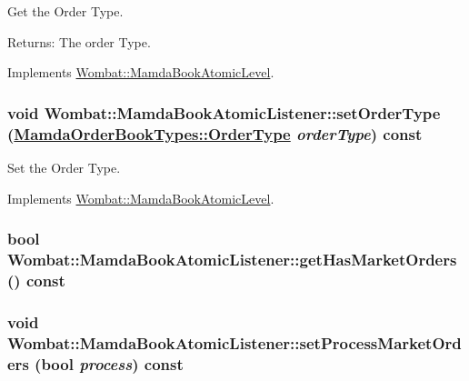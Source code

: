 Get the Order Type. 

\begin{Desc}
\item[Returns:]The order Type. \end{Desc}


Implements \hyperlink{classWombat_1_1MamdaBookAtomicLevel_23ff595e16fe3926bb2714c5c2026841}{Wombat::Mamda\-Book\-Atomic\-Level}.\hypertarget{classWombat_1_1MamdaBookAtomicListener_e79c2bbb2c0431a40df5788700a26c32}{
\subsubsection[setOrderType]{\setlength{\rightskip}{0pt plus 5cm}void Wombat::Mamda\-Book\-Atomic\-Listener::set\-Order\-Type (\hyperlink{classWombat_1_1MamdaOrderBookTypes_b1b75d93c83c5a1042c392ab46a27291}{Mamda\-Order\-Book\-Types::Order\-Type} {\em order\-Type}) const}}
\label{classWombat_1_1MamdaBookAtomicListener_e79c2bbb2c0431a40df5788700a26c32}


Set the Order Type. 



Implements \hyperlink{classWombat_1_1MamdaBookAtomicLevel_6b9fa11952fb136aceda2810f3131aeb}{Wombat::Mamda\-Book\-Atomic\-Level}.\hypertarget{classWombat_1_1MamdaBookAtomicListener_67cf7b76360ca22ced5384aa52bf9873}{
\subsubsection[getHasMarketOrders]{\setlength{\rightskip}{0pt plus 5cm}bool Wombat::Mamda\-Book\-Atomic\-Listener::get\-Has\-Market\-Orders () const}}
\label{classWombat_1_1MamdaBookAtomicListener_67cf7b76360ca22ced5384aa52bf9873}


\hypertarget{classWombat_1_1MamdaBookAtomicListener_70a97f14892aaa3a9887b12ccc816651}{
\subsubsection[setProcessMarketOrders]{\setlength{\rightskip}{0pt plus 5cm}void Wombat::Mamda\-Book\-Atomic\-Listener::set\-Process\-Market\-Orders (bool {\em process}) const}}
\label{classWombat_1_1MamdaBookAtomicListener_70a97f14892aaa3a9887b12ccc816651}


